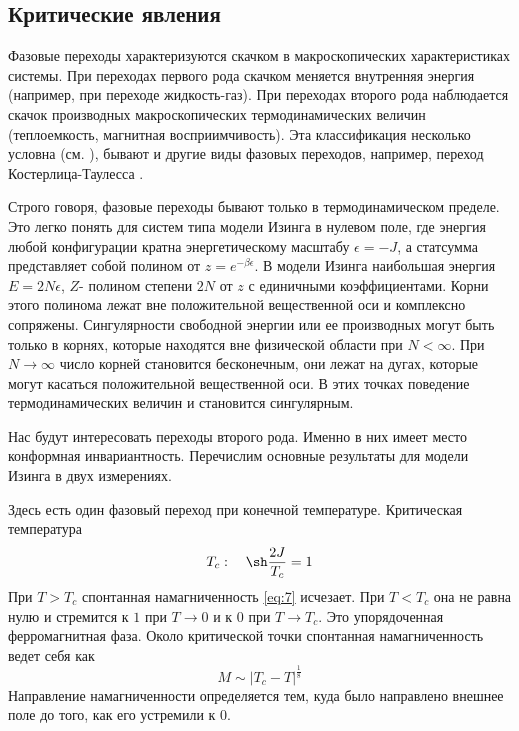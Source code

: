 \documentclass[a4paper,12pt]{article}
\theoremstyle{definition}
\theoremstyle{definition}
\theoremstyle{definition}
\begin{document}
\subsection{Критические явления}
\label{sec:critical-phenomena}

Фазовые переходы характеризуются скачком в макроскопических характеристиках системы. При переходах
первого рода скачком меняется внутренняя энергия (например, при переходе жидкость-газ). При
переходах второго рода наблюдается скачок производных макроскопических термодинамических величин
(теплоемкость, магнитная восприимчивость).  Эта классификация несколько условна (см.
\cite{ma2000modern,ma1980}), бывают и другие виды фазовых переходов, например, переход
Костерлица-Таулесса \cite{0022-3719-6-7-010}.  

Строго говоря, фазовые переходы бывают только в термодинамическом пределе. Это легко понять для
систем типа модели Изинга в нулевом поле, где энергия любой конфигурации кратна энергетическому
масштабу $\epsilon=-J$, а статсумма представляет собой полином от $z=e^{-\beta\epsilon}$. В модели
Изинга наибольшая энергия $E=2N\epsilon$, $Z$- полином степени $2N$ от $z$ с единичными
коэффициентами. Корни этого полинома лежат вне положительной вещественной оси и комплексно
сопряжены. Сингулярности свободной энергии или ее производных могут быть только в корнях, которые
находятся вне физической области при $N<\infty$. При $N\to \infty$ число корней становится
бесконечным, они лежат на дугах, которые могут касаться положительной вещественной оси. В этих
точках поведение термодинамических величин и становится сингулярным. 

Нас будут интересовать переходы второго рода. Именно в них имеет место конформная инвариантность. 
Перечислим основные результаты для модели Изинга в двух измерениях.

Здесь есть один фазовый переход при конечной температуре. 
Критическая температура
\begin{equation}
  \label{eq:27}
  T_c:\quad \sh \frac{2J}{T_c}=1
\end{equation}
При $T>T_c$ спонтанная намагниченность \eqref{eq:7} исчезает. При $T<T_c$ она не равна нулю и
стремится к $1$ при $T\to 0$ и к $0$ при $T\to T_c$. Это упорядоченная ферромагнитная фаза. Около
критической точки спонтанная намагниченность ведет себя как 
\begin{equation}
  \label{eq:28}
  M\sim \left|T_c-T\right|^{\frac{1}{8}}
\end{equation}
Направление намагниченности определяется тем, куда было направлено внешнее поле до того, как его устремили к $0$. 
\end{document}
